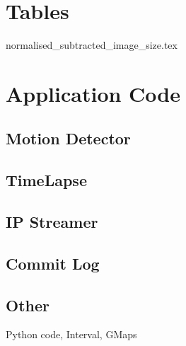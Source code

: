\documentclass[11pt]{article} %
\begin{document}
\section{Tables}
{normalised_subtracted_image_size.tex}


\section{Application Code}
\subsection{Motion Detector}
\subsection{TimeLapse}
\subsection{IP Streamer}
\subsection{Commit Log}
\subsection{Other}{Python code, Interval, GMaps}
\end{document}
